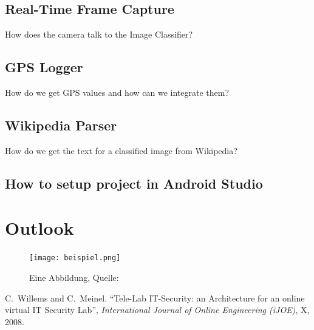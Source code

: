 \documentclass[a4paper,12pt,pagesize,headsepline,bibtotoc,titlepage]{scrartcl}
\begin{document}
\subsection {Real-Time Frame Capture}
How does the camera talk to the Image Classifier?

\subsection {GPS Logger}
How do we get GPS values and how can we integrate them?

\subsection {Wikipedia Parser}
How do we get the text for a classified image from Wikipedia?

\subsection{How to setup project in Android Studio}

\section{Outlook}


\begin{figure}[hbp]
\begin{center}
\texttt{[image: beispiel.png]}\\
\caption{Eine Abbildung, Quelle: \cite{willems2008}}
\label{abb:test}
\end{center}
\end{figure}

\newpage
\begin{thebibliography}{1}

C.~Willems and C.~Meinel.
``Tele-Lab IT-Security: an Architecture for an online virtual IT Security Lab'',
\emph{International Journal of Online Engineering (iJOE)},
X, 2008.

\end{thebibliography}
\end{document}
